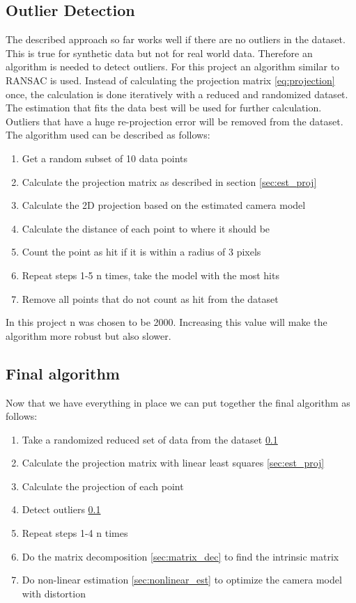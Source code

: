 \documentclass[11pt,a4paper,titlepage,oneside]{report}
\begin{document}
\subsection{Outlier Detection}\label{sec:outliers}
The described approach so far works well if there are no outliers in the dataset. This is true for synthetic data but not for real world data. Therefore an algorithm is needed to detect outliers. For this project an algorithm similar to RANSAC \cite{ransac} is used. Instead of calculating the projection matrix \ref{eq:projection} once, the calculation is done iteratively with a reduced and randomized dataset. The estimation that fits the data best will be used for further calculation. Outliers that have a huge re-projection error will be removed from the dataset. The algorithm used can be described as follows:
\begin{enumerate}
	\item Get a random subset of 10 data points
	\item Calculate the projection matrix as described in section \ref{sec:est_proj}
	\item Calculate the 2D projection based on the estimated camera model
	\item Calculate the distance of each point to where it should be
	\item Count the point as hit if it is within a radius of 3 pixels
	\item Repeat steps 1-5 n times, take the model with the most hits
	\item Remove all points that do not count as hit from the dataset
\end{enumerate}

In this project n was chosen to be 2000. Increasing this value will make the algorithm more robust but also slower.

\subsection{Final algorithm}
Now that we have everything in place we can put together the final algorithm as follows:
\begin{enumerate}
	\item Take a randomized reduced set of data from the dataset \ref{sec:outliers}
	\item Calculate the projection matrix with linear least squares \ref{sec:est_proj}
	\item Calculate the projection of each point
	\item Detect outliers \ref{sec:outliers}
	\item Repeat steps 1-4 n times
	\item Do the matrix decomposition \ref{sec:matrix_dec} to find the intrinsic matrix
	\item Do non-linear estimation \ref{sec:nonlinear_est} to optimize the camera model with distortion
\end{enumerate}
\end{document}
